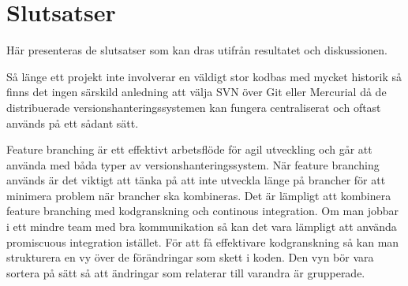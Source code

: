 \section{Slutsatser}
\label{sec:bjorn-conclusion}
Här presenteras de slutsatser som kan dras utifrån resultatet och diskussionen.

%

Så länge ett projekt inte involverar en väldigt stor kodbas med mycket historik så finns det ingen särskild anledning att välja SVN över Git eller Mercurial då de distribuerade versionshanteringssystemen kan fungera centraliserat och oftast används på ett sådant sätt.

Feature branching är ett effektivt arbetsflöde för agil utveckling och går att använda med båda typer av versionshanteringssystem. När feature branching används är det viktigt att tänka på att inte utveckla länge på brancher för att minimera problem när brancher ska kombineras. Det är lämpligt att kombinera feature branching med kodgranskning och continous integration. Om man jobbar i ett mindre team med bra kommunikation så kan det vara lämpligt att använda promiscuous integration istället. För att få effektivare kodgranskning så kan man strukturera en vy över de förändringar som skett i koden. Den vyn bör vara sortera på sätt så att ändringar som relaterar till varandra är grupperade.